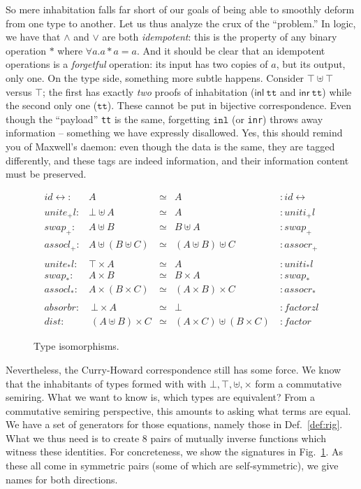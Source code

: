 \documentclass{article}
\newcommand{\inl}[1]{\textsf{inl}~#1}
\newcommand{\inr}[1]{\textsf{inr}~#1}
\newcommand{\identlp}{\ensuremath{\mathit{unite}_+\mathit{l}}}
\newcommand{\identrp}{\ensuremath{\mathit{uniti}_+\mathit{l}}}
\newcommand{\swapp}{\ensuremath{\mathit{swap}_+}}
\newcommand{\assoclp}{\ensuremath{\mathit{assocl}_+}}
\newcommand{\assocrp}{\ensuremath{\mathit{assocr}_+}}
\newcommand{\identlt}{\ensuremath{\mathit{unite}_*\mathit{l}}}
\newcommand{\identrt}{\ensuremath{\mathit{uniti}_*\mathit{l}}}
\newcommand{\swapt}{\ensuremath{\mathit{swap}_*}}
\newcommand{\assoclt}{\ensuremath{\mathit{assocl}_*}}
\newcommand{\assocrt}{\ensuremath{\mathit{assocr}_*}}
\newcommand{\absorbr}{\ensuremath{\mathit{absorbr}}}
\newcommand{\factorzl}{\ensuremath{\mathit{factorzl}}}
\newcommand{\dist}{\ensuremath{\mathit{dist}}}
\newcommand{\factor}{\ensuremath{\mathit{factor}}}
\newcommand{\idc}{\mathit{id}\!\!\leftrightarrow}
\begin{document}
So mere inhabitation falls far short of our goals of being able to
smoothly deform from one type to another. Let us thus analyze the crux
of the ``problem.'' In logic, we have that $\land$ and $\lor$ are both
\emph{idempotent}: this is the property of any binary operation $*$
where $\forall a. a * a = a$. And it should be clear that an
idempotent operations is a \emph{forgetful} operation: its input has
two copies of $a$, but its output, only one. On the type side,
something more subtle happens. Consider $\top \uplus \top$
versus $\top$; the first has exactly \emph{two} proofs of inhabitation
($\inl{\texttt{tt}}$ and $\inr{\texttt{tt}}$) while the second only one
($\texttt{tt}$). These cannot be put in bijective correspondence. Even
though the ``payload'' \texttt{tt} is the same, forgetting
$\texttt{inl}$ (or \texttt{inr}) throws away information -- something
we have expressly disallowed.  Yes, this should remind you of
Maxwell's daemon: even though the data is the same, they are tagged
differently, and these tags are indeed information, and their
information content must be preserved.

\begin{figure}[t]
\[
\begin{array}{rrcll}
\idc :& A & \simeq & A &: \idc \\
\\
\identlp :&  \bot \uplus A & \simeq & A &: \identrp \\
\swapp :&  A \uplus B & \simeq & B \uplus A &: \swapp \\
\assoclp :&  A \uplus (B \uplus C) & \simeq & (A \uplus B) \uplus C &: \assocrp \\
\\
\identlt :&  \top \times A & \simeq & A &: \identrt \\
\swapt :&  A \times B & \simeq & B \times A &: \swapt \\
\assoclt :&  A \times (B \times C) & \simeq & (A \times B) \times C &: \assocrt \\
\\
\absorbr :&~ \bot \times A & \simeq & \bot ~ &: \factorzl \\
\dist :&~ (A \uplus B) \times C & \simeq & (A \times C) \uplus (B \times C)~ &: \factor
\end{array}
\]
\caption{Type isomorphisms.}
\label{type-isos}
\end{figure}

Nevertheless, the Curry-Howard correspondence still has some force. We
know that the inhabitants of types formed with with
$\bot, \top, \uplus, \times$ form a commutative semiring. What we want
to know is, which types are equivalent? From a commutative semiring
perspective, this amounts to asking what terms are equal.  We have a
set of generators for those equations, namely those in
Def.~\ref{def:rig}. What we thus need is to create $8$ pairs of
mutually inverse functions which witness these identities.  For
concreteness, we show the signatures in Fig.~\ref{type-isos}.  As
these all come in symmetric pairs (some of which are self-symmetric),
we give names for both directions.
\end{document}
